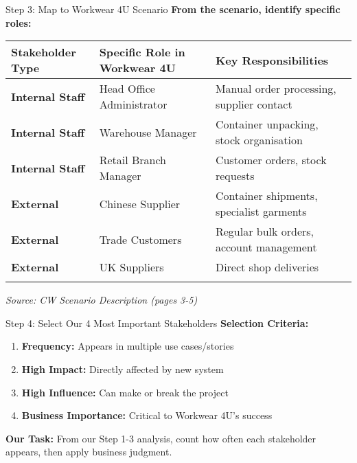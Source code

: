 \documentclass[
  ignorenonframetext,
]{beamer}
\providecommand{\tightlist}{%
  \setlength{\itemsep}{0pt}\setlength{\parskip}{0pt}}
\begin{document}
\begin{frame}{Step 3: Map to Workwear 4U Scenario}
\label{step-3-map-to-workwear-4u-scenario}
\textbf{From the scenario, identify specific roles:}

\begin{longtable}[]{@{}
  >{\raggedright\arraybackslash}p{}
  >{\raggedright\arraybackslash}p{}
  >{\raggedright\arraybackslash}p{}@{}}
\toprule\noalign{}
\begin{minipage}[b]{\linewidth}\raggedright
Stakeholder Type
\end{minipage} & \begin{minipage}[b]{\linewidth}\raggedright
Specific Role in Workwear 4U
\end{minipage} & \begin{minipage}[b]{\linewidth}\raggedright
Key Responsibilities
\end{minipage} \\
\midrule\noalign{}
\endhead
\textbf{Internal Staff} & Head Office Administrator & Manual order
processing, supplier contact \\
\textbf{Internal Staff} & Warehouse Manager & Container unpacking, stock
organisation \\
\textbf{Internal Staff} & Retail Branch Manager & Customer orders, stock
requests \\
\textbf{External} & Chinese Supplier & Container shipments, specialist
garments \\
\textbf{External} & Trade Customers & Regular bulk orders, account
management \\
\textbf{External} & UK Suppliers & Direct shop deliveries \\
\bottomrule\noalign{}
\end{longtable}

\emph{Source: CW Scenario Description (pages 3-5)}
\end{frame}

\begin{frame}{Step 4: Select Our 4 Most Important Stakeholders}
\label{step-4-select-our-4-most-important-stakeholders}
\textbf{Selection Criteria:}

\begin{enumerate}
\tightlist
\item
  \textbf{Frequency:} Appears in multiple use cases/stories
\item
  \textbf{High Impact:} Directly affected by new system
\item
  \textbf{High Influence:} Can make or break the project
\item
  \textbf{Business Importance:} Critical to Workwear 4U's success
\end{enumerate}

\textbf{Our Task:} From our Step 1-3 analysis, count how often each
stakeholder appears, then apply business judgment.
\end{frame}
\end{document}
